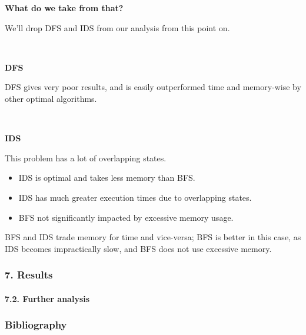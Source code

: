 \documentclass{beamer}
\newcommand{\errorband}[5][]{ %
\pgfplotstableread{#2}\datatable
    \addplot [draw=none, stack plots=y, forget plot] table [
        x={#3},
        y expr=\thisrow{#4}-2*\thisrow{#5}
    ] {\datatable};

    \addplot [draw=none, fill=gray!40, stack plots=y, area legend, #1] table [
        x={#3},
        y expr=4*\thisrow{#5}
    ] {\datatable} \closedcycle;

    \addplot [forget plot, stack plots=y,draw=none] table [x={#3}, y expr=-(\thisrow{#4}+2*\thisrow{#5})] {\datatable};
}
\begin{document}
\begin{frame}%

  {\Large \textbf{What do we take from that?}}

  We'll drop DFS and IDS from our analysis from this point on.

  ~

  \textbf{DFS}

  DFS gives very poor results, and is easily outperformed time and memory-wise by other optimal algorithms.

  ~

  \textbf{IDS}

  This problem has a lot of overlapping states.
  \begin{itemize}
    \item IDS is optimal and takes less memory than BFS.
    \item IDS has much greater execution times due to overlapping states.
    \item BFS not significantly impacted by excessive memory usage.
  \end{itemize}

  BFS and IDS trade memory for time and vice-versa; BFS is better in this case, as IDS becomes impractically slow, and BFS does not use excessive memory.
\end{frame}

\begin{frame}
  \frametitle{7. Results}
  \framesubtitle{7.2. Further analysis}
  
  \begin{figure}
  \end{figure}

\end{frame}

\begin{frame}
  \frametitle{Bibliography}
  
  
  
\end{frame}
\end{document}
